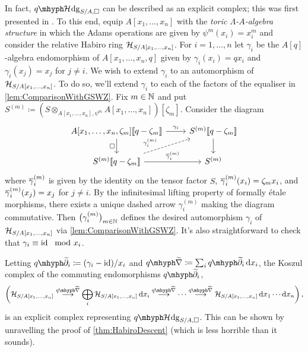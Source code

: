 \documentclass[DIV=12,numbers=enddot,leqno,bibliography=totoc]{scrartcl}
\begin{document}
\begin{exm}
		In fact, $\qHhodge_{S/A, \square}$ can be described as an explicit complex; this was first presented in \cite[Lecture~\href{https://archive.mpim-bonn.mpg.de/id/eprint/5155/10/habiro_cohomology04.mp4}{4}]{HabiroCohomologyLecture}. To this end, equip $A[x_1,\dotsc,x_n]$ with the \emph{toric $\Lambda$-$A$-algebra structure} in which the Adams operations are given by $\psi^m(x_i)=x_i^m$ and consider the relative Habiro ring $\mathcal{H}_{S/A[x_1,\dotsc,x_n]}$. For $i=1,\dotsc,n$ let  $\gamma_i$ be the $A[q]$-algebra endomorphism of $A[x_1,\dotsc,x_n,q]$ given by $\gamma_i(x_i)=qx_i$ and $\gamma_i(x_j)=x_j$ for $j\neq i$. We wish to extend $\gamma_i$ to an automorphism of $\mathcal{H}_{S/A[x_1,\dotsc,x_n]}$. To do so, we'll extend $\gamma_i$ to each of the factors of the equaliser in \cref{lem:ComparisonWithGSWZ}. Fix $m\in\mathbb{N}$ and put $S^{(m)}\coloneqq (S\otimes_{A[x_1,\dotsc,x_n],\psi^m}A[x_1,\dotsc,x_n])[\zeta_m]$. Consider the diagram
		\begin{equation*}
			\begin{tikzcd}
				A[x_1,\dotsc,x_n,\zeta_m]\llbracket q-\zeta_m\rrbracket\dar["\square"']\rar["\gamma_i"] & S^{(m)}\llbracket q-\zeta_m\rrbracket\dar\\
				S^{(m)}\llbracket q-\zeta_m\rrbracket\rar["\ov\gamma_i^{(m)}"]\urar["\gamma_i^{(m)}"{pos=0.33},dashed] & S^{(m)}
			\end{tikzcd}
		\end{equation*}
		where $\ov\gamma_i^{(m)}$ is given by the identity on the tensor factor $S$, $\ov\gamma_i^{(m)}(x_i)=\zeta_m x_i$, and $\ov\gamma_i^{(m)}(x_j)=x_j$ for $j\neq i$. By the infinitesimal lifting property of formally étale morphisms, there exists a unique dashed arrow $\gamma_i^{(m)}$ making the diagram commutative. Then $\bigl(\gamma_i^{(m)}\bigr)_{m\in\mathbb{N}}$ defines the desired automorphism $\gamma_i$ of $\mathcal{H}_{S/A[x_1,\dotsc,x_n]}$ via \cref{lem:ComparisonWithGSWZ}. It's also straightforward to check that $\gamma_i\equiv \operatorname{id}\mod x_i$.
		
		Letting $\q\widetilde{\partial}_i\coloneqq (\gamma_i-\id)/x_i$ and $\q\widetilde{\nabla}\coloneqq \sum_i\q\widetilde{\partial}_i\d x_i$, the Koszul complex of the commuting endomorphisms $\q\widetilde{\partial}_i$,
		\begin{equation*}
			\biggl(\Hh_{S/A[x_1,\dotsc,x_n]}\overset{\q\widetilde{\nabla}}{\longrightarrow} \bigoplus_{i}\Hh_{S/A[x_1,\dotsc,x_n]}\d x_i\overset{\q\widetilde{\nabla}}{\longrightarrow}\dotsb\overset{\q\widetilde{\nabla}}{\longrightarrow}\Hh_{S/A[x_1,\dotsc,x_n]}\d x_1\dotsm\d x_n\biggr)\,,
		\end{equation*}
		is an explicit complex representing $\qHhodge_{S/A, \square}$. This can be shown by unravelling the proof of \cref{thm:HabiroDescent} (which is less horrible than it sounds).
	\end{exm}
\end{document}
